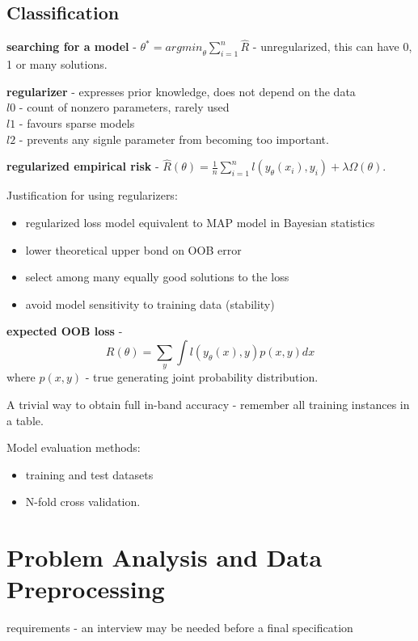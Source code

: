 \documentclass{article}
\newcommand{\para}[0]{\par\vspace{0.2cm}\noindent}
\newcommand{\define}[2]{\textbf{#1} - {#2}.  \para}
\begin{document}
\subsection{Classification}
\define{searching for a model}
           {$\theta^* = {argmin}_\theta \sum_{i=1}^n \hat R$ - unregularized, this can have 0, 1 or many solutions}

\define{regularizer}
           {expresses prior knowledge, does not depend on the data  \\
            $l0$ - count of nonzero parameters, rarely used  \\
            $l1$ - favours sparse models  \\
            $l2$ - prevents any signle parameter from becoming too important}

\define{regularized empirical risk}
           {$\hat R(\theta) = \frac{1}{n} \sum_{i=1}^n l(y_\theta(x_i), y_i) + \lambda \Omega (\theta)$}

Justification for using regularizers:
\begin{itemize}
    \item{regularized loss model equivalent to MAP model in Bayesian statistics}
    \item{lower theoretical upper bond on OOB error}
    \item{select among many equally good solutions to the loss}
    \item{avoid model sensitivity to training data (stability)}
\end{itemize}

\define{expected OOB loss}{
    $$R(\theta) = \sum_y \int l(y_\theta(x), y) p(x, y) dx$$
    where $p(x, y)$ - true generating joint probability distribution}

A trivial way to obtain full in-band accuracy - remember all training instances in a table.  \\
\par
Model evaluation methods:
\begin{itemize}
    \item{training and test datasets}
    \item{N-fold cross validation.}
\end{itemize}


\section{Problem Analysis and Data Preprocessing}
requirements - an interview may be needed before a final specification
\end{document}
